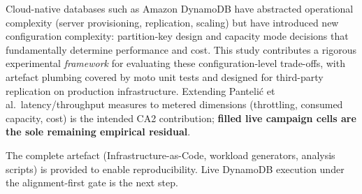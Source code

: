 Cloud-native databases such as Amazon DynamoDB have abstracted operational complexity (server provisioning, replication, scaling) but have introduced new configuration complexity: partition-key design and capacity mode decisions that fundamentally determine performance and cost. This study contributes a rigorous experimental \emph{framework} for evaluating these configuration-level trade-offs, with artefact plumbing covered by moto unit tests and designed for third-party replication on production infrastructure. Extending Panteli\'{c} et al.\ latency/throughput measures to metered dimensions (throttling, consumed capacity, cost) is the intended CA2 contribution; \textbf{filled live campaign cells are the sole remaining empirical residual}.

The complete artefact (Infrastructure-as-Code, workload generators, analysis scripts) is provided to enable reproducibility. Live DynamoDB execution under the alignment-first gate is the next step.
